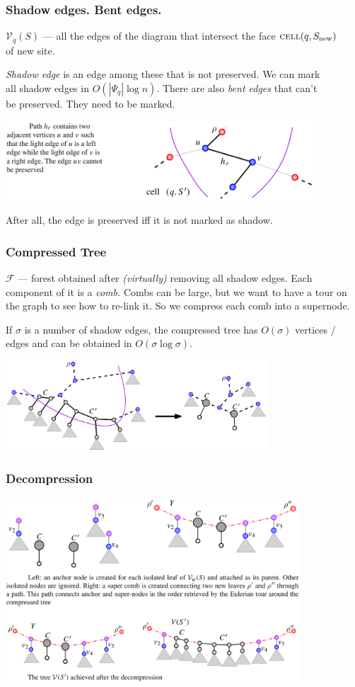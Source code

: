\begin{frame} \frametitle{Shadow edges. Bent edges.} \vspace{-2mm}
	$\mathcal V_q (S)$ — all the edges of the diagram that intersect the face $\text{\scshape cell} (q, S_\text{new})$ \\
	of new site. \medskip
	
	{\it Shadow edge} is an edge among these that is not preserved. We can mark \\
	all shadow edges in $O(|\Psi_q| \log n)$. There are also {\it bent edges} that can't \\
	be preserved. They need to be marked. 

\begin{center}
	\includegraphics[width=11.5cm]{figs/bent.png} \vspace{-3mm}
\end{center}

	After all, the edge is preserved iff it is not marked as shadow.
\end{frame}

\begin{frame} \frametitle{Compressed Tree} \label{pg:compres}
	$\mathcal F$ — forest obtained after {\it (virtually)} removing all shadow edges. Each component of it is a {\it comb.} Combs can be large, but we want to have a tour on the graph to see how to re-link it. So we compress each comb into a supernode. \medskip

	If $\sigma$ is a number of shadow edges, the compressed tree has $O(\sigma)$ vertices / edges and can be obtained in $O(\sigma \log \sigma)$. \smallskip

\begin{center}
	\includegraphics[width=9.8cm]{figs/compres}
\end{center}
\end{frame}

\begin{frame} \frametitle{Decompression}
\begin{center}
	\includegraphics[width=11cm]{figs/decompres}
\end{center}
\end{frame}